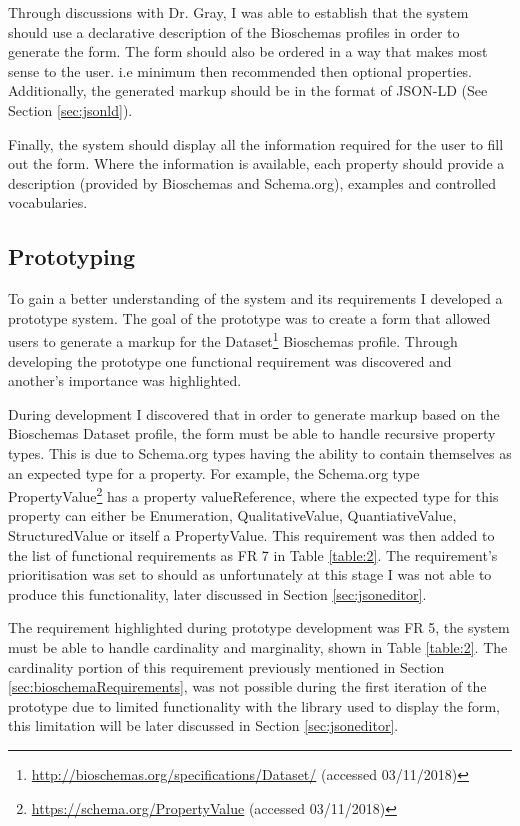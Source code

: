 Through discussions with Dr. Gray, I was able to establish that the system should use a declarative description of the Bioschemas profiles in order to generate the form. The form should also be ordered in a way that makes most sense to the user. i.e minimum then recommended then optional properties. Additionally, the generated markup should be in the format of JSON-LD (See Section \ref{sec:jsonld}).

Finally, the system should display all the information required for the user to fill out the form. Where the information is available, each property should provide a description (provided by Bioschemas and Schema.org), examples and controlled vocabularies. 

\subsection{Prototyping}\label{ch:prototyping}
To gain a better understanding of the system and its requirements I developed a prototype system. The goal of the prototype was to create a form that allowed users to generate a markup for the Dataset\footnote{\url{http://bioschemas.org/specifications/Dataset/} (accessed 03/11/2018)} Bioschemas profile. Through developing the prototype one functional requirement was discovered and another's importance was highlighted.

During development I discovered that in order to generate markup based on the Bioschemas Dataset profile, the form must be able to handle recursive property types. This is due to Schema.org types having the ability to contain themselves as an expected type for a property. For example, the Schema.org type PropertyValue\footnote{\url{https://schema.org/PropertyValue} (accessed 03/11/2018)} has a property valueReference, where the expected type for this property can either be Enumeration, QualitativeValue, QuantiativeValue, StructuredValue or itself a PropertyValue. This requirement was then added to the list of functional requirements as FR 7 in Table \ref{table:2}. The requirement's prioritisation was set to should as unfortunately at this stage I was not able to produce this functionality, later discussed in Section \ref{sec:jsoneditor}.

\newpage
The requirement highlighted during prototype development was FR 5, the system must be able to handle cardinality and marginality, shown in Table \ref{table:2}. The cardinality portion of this requirement previously mentioned in Section \ref{sec:bioschemaRequirements}, was not possible during the first iteration of the prototype due to limited functionality with the library used to display the form, this limitation will be later discussed in Section \ref{sec:jsoneditor}.


